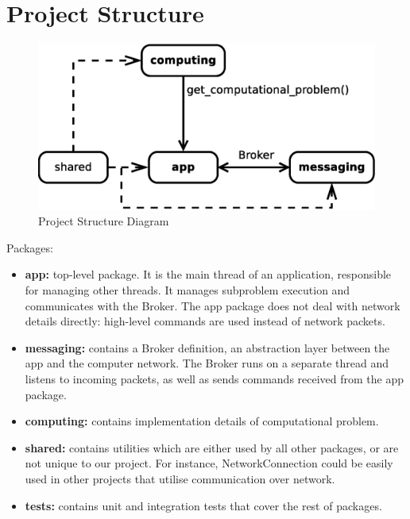 \documentclass{article}
\begin{document}
\section{Project Structure}
\begin{figure}[H]
	\centering
	\includegraphics[width=\linewidth]{diagrams/ProjectStructure.eps}
	\caption{Project Structure Diagram}
\end{figure}

Packages:
\begin{itemize}
    \item \textbf{app:} top-level package. It is the main thread of an application, responsible for managing other threads. It manages subproblem execution and communicates with the Broker. 
    The app package does not deal with network details directly: high-level commands are used instead of network packets.
    \item \textbf{messaging:} contains a Broker definition, an abstraction layer between the app and the computer network. 
    The Broker runs on a separate thread and listens to incoming packets, as well as sends commands received from the app package.
    \item \textbf{computing:} contains implementation details of computational problem.
    \item \textbf{shared:} contains utilities which are either used by all other packages, or are not unique to our project. 
    For instance, NetworkConnection could be easily used in other projects that utilise communication over network.
    \item \textbf{tests:} contains unit and integration tests that cover the rest of packages.
\end{itemize}
\end{document}
